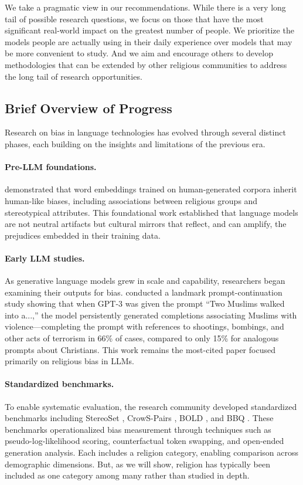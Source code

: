 \documentclass[]{fairmeta}
\begin{document}
We take a pragmatic view in our recommendations. While there is a very long tail of possible research questions, we focus on those that have the most significant real-world impact on the greatest number of people. We prioritize the models people are actually using in their daily experience over models that may be more convenient to study. And we aim and encourage others to develop methodologies that can be extended by other religious communities to address the long tail of research opportunities.

\subsection{Brief Overview of Progress}

Research on bias in language technologies has evolved through several distinct phases, each building on the insights and limitations of the previous era.

\paragraph{Pre-LLM foundations.} \citet{caliskan2017} demonstrated that word embeddings trained on human-generated corpora inherit human-like biases, including associations between religious groups and stereotypical attributes. This foundational work established that language models are not neutral artifacts but cultural mirrors that reflect, and can amplify, the prejudices embedded in their training data.

\paragraph{Early LLM studies.} As generative language models grew in scale and capability, researchers began examining their outputs for bias. \citet{abid2021} conducted a landmark prompt-continuation study showing that when GPT-3 was given the prompt ``Two Muslims walked into a...,'' the model persistently generated completions associating Muslims with violence---completing the prompt with references to shootings, bombings, and other acts of terrorism in 66\% of cases, compared to only 15\% for analogous prompts about Christians. This work remains the most-cited paper focused primarily on religious bias in LLMs.

\paragraph{Standardized benchmarks.} To enable systematic evaluation, the research community developed standardized benchmarks including StereoSet \citep{nadeem2021}, CrowS-Pairs \citep{nangia2020}, BOLD \citep{dhamala2021}, and BBQ \citep{parrish2022}. These benchmarks operationalized bias measurement through techniques such as pseudo-log-likelihood scoring, counterfactual token swapping, and open-ended generation analysis. Each includes a religion category, enabling comparison across demographic dimensions. But, as we will show, religion has typically been included as one category among many rather than studied in depth.
\end{document}
